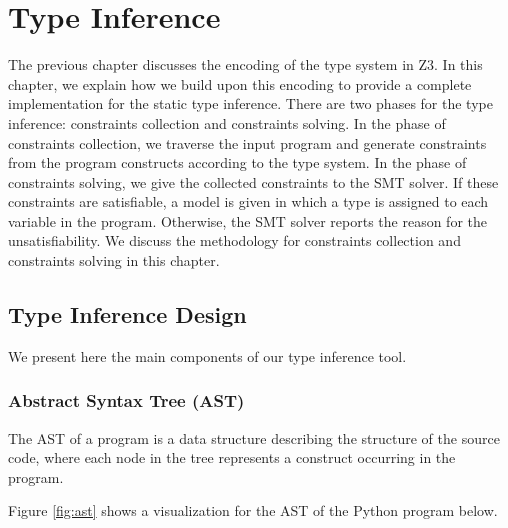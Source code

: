 
\chapter{Type Inference}\label{chapter:ti}
The previous chapter discusses the encoding of the type system in Z3. In this chapter, we explain how we build upon this encoding to provide a complete implementation for the static type inference. There are two phases for the type inference: constraints collection and constraints solving. In the phase of constraints collection, we traverse the input program and generate constraints from the program constructs according to the type system. In the phase of constraints solving, we give the collected constraints to the SMT solver. If these constraints are satisfiable, a model is given in which a type is assigned to each variable in the program. Otherwise, the SMT solver reports the reason for the unsatisfiability. We discuss the methodology for constraints collection and constraints solving in this chapter.

\section{Type Inference Design}
We present here the main components of our type inference tool.
\subsection{Abstract Syntax Tree (AST)}
The AST of a program is a data structure describing the structure of the source code, where each node in the tree represents a construct occurring in the program.

Figure \ref{fig:ast} shows a visualization for the AST of the Python program below.

